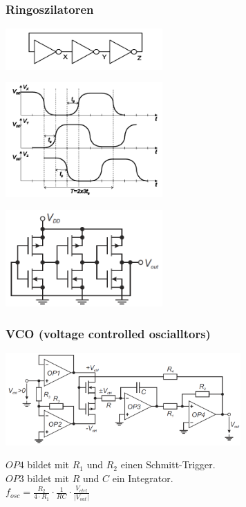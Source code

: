 \subsubsection{Ringoszilatoren}
	\begin{multicols}{3}
	 	\includegraphics[width=6cm]{images/osziRing.png}	
		\columnbreak
		
		\includegraphics[width=6cm]{images/osziRingSignal.png}	
		\columnbreak
		
		\includegraphics[width=6cm]{images/osziRingCMOS.png}
	\end{multicols}
\subsubsection{VCO (voltage controlled oscialltors)}
	\begin{multicols}{2}
		\includegraphics[width=9cm]{images/osciVCO.png}
		\columnbreak
		
		$OP4$ bildet mit $R_1$ und $R_2$ einen Schmitt-Trigger.\\
		$OP3$ bildet mit $R$ und $C$ ein Integrator.\\
		$f_{osc}=\frac{R_2}{4\cdot R_1}\cdot \frac{1}{RC}\cdot
		\frac{V_{ctrl}}{\left|V_{out}\right|}$\\
	\end{multicols}
	
